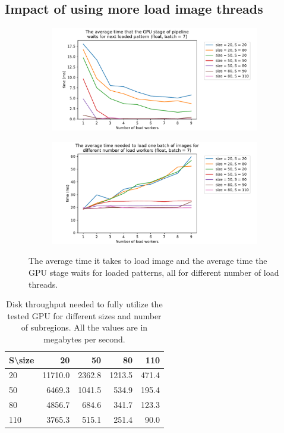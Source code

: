 \subsection{Impact of using more load image threads}

\begin{figure}
	\centering
	\begin{subfigure}{\textwidth}
		\centering
		\includegraphics[width=0.75\linewidth]{img/eval/loadworkers-offset-wait}
		\caption{}
		\label{loadworkers-offset-wait}
	\end{subfigure}
	
	\begin{subfigure}{\textwidth}
		\centering
		\includegraphics[width=0.75\linewidth]{img/eval/loadworkers-load-tiff}
		\caption{}
		\label{loadworkers-load-tiff}
	\end{subfigure}


	\caption{The average time it takes to load image and the average time the GPU stage waits for loaded patterns, all for different number of load threads.}
	\label{loadworkers}
\end{figure}

\begin{table}[]
	\centering
	\begin{tabular}{@{}l|rrrr@{}}
		S\textbackslash size &      20 &     50 &     80 &   110 \\ \midrule
		20                   & 11710.0 & 2362.8 & 1213.5 & 471.4 \\
		50                   &  6469.3 & 1041.5 &  534.9 & 195.4 \\
		80                   &  4856.7 &  684.6 &  341.7 & 123.3 \\
		110                  &  3765.3 &  515.1 &  251.4 &  90.0
	\end{tabular}
	\caption{Disk throughput needed to fully utilize the tested GPU for different sizes and number of subregions. All the values are in megabytes per second.}
	\label{loadworkers-table}
\end{table}


